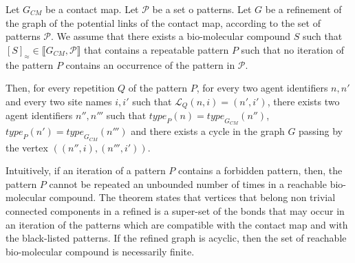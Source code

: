 \documentclass{entcs}
\newcommand{\graphsymb}{G}
\newcommand{\iso}{\approx}
\newcommand{\type}[1][\graphsymb]{\textit{type}_{#1}}
\newcommand{\links}[1][\graphsymb]{\mathcal{L}_{#1}}
\begin{document}
\begin{theorem}
  \label{th:linkbis}
  Let $\graphsymb_{\textit{CM}}$ be a contact map.
  Let $\mathcal{P}$ be a set o patterns.
  Let $G$ be a refinement of the graph of the potential links of the contact map, according to the set of patterns $\mathcal{P}$. We assume that there exists a bio-molecular compound $S$ such that $[S]_{\iso} \in \llbracket \graphsymb_{\textit{CM}}, \mathcal{P}\rrbracket$ that contains a repeatable pattern $P$ such that no iteration of the pattern $P$  contains an occurrence of the pattern in $\mathcal{P}$.

  Then, for every repetition $Q$ of the pattern $P$, for every two agent identifiers $n,n'$ and every two site names $i,i'$ such that $\links[Q](n,i)=(n',i')$, there exists two agent identifiers $n'',n'''$ such that $\type[P](n)=\type[\graphsymb_{\textit{CM}}](n'')$,
  $\type[P](n')=\type[\graphsymb_{\textit{CM}}](n''')$ and
  there exists a cycle in the graph $G$ passing by  the vertex $((n'',i),(n''',i'))$.
\end{theorem}

Intuitively, if an iteration of a pattern $P$ contains a forbidden pattern, then, the pattern $P$ cannot be repeated an unbounded number of times in a reachable bio-molecular compound. The theorem states that
vertices that belong non trivial connected components in a refined
is a super-set of the bonds that may occur in an iteration  of the patterns  which are compatible with the contact map and with the black-listed patterns. If the refined graph is acyclic, then
the set of reachable bio-molecular compound is necessarily finite.
\end{document}
